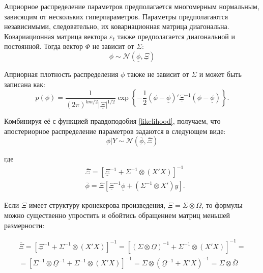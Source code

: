 \documentclass[11pt]{article} %
\newcommand{\cN}{\mathcal{N}}
\newcommand{\prior}{\underline}
\newcommand{\post}{\overline}
\begin{document}


Априорное распределение параметров предполагается многомерным нормальным, зависящим от нескольких гиперпараметров. Параметры предполагаются независимыми, следовательно, их ковариационная матрица диагональна. Ковариационная матрица вектора $\varepsilon_t$ также предполагается диагональной и постоянной.
Тогда вектор $\Phi$ не зависит от $\Sigma$:
\begin{equation}
\phi\sim \cN(\prior \phi, \prior \Xi)
\end{equation}

Априорная плотность распределения $\phi$ также не зависит от $\Sigma$ и может быть записана как:
\begin{equation}
p(\phi)=\frac{1}{(2\pi)^{km/2}|\prior\Xi|^{1/2}} \exp \left\lbrace-\frac{1}{2}(\phi-\prior \phi)'\prior\Xi^{-1}(\phi-\prior \phi ) \right\rbrace.
\end{equation}

Комбинируя её с функцией правдоподобия \eqref{likelihood}, получаем, что апостериорное распределение параметров задаются в следующем виде:
\begin{equation}
\phi|Y\sim \cN(\post{\phi},\post \Xi)
\end{equation}

где
\begin{align*}
&\post \Xi=[\prior \Xi^{-1}+\Sigma^{-1}\otimes(X'X)]^{-1}\\
& \post \phi=\post{\Xi}[\prior \Xi^{-1}\prior \phi+(\Sigma^{-1}\otimes X')y].
\end{align*}

Если $\prior\Xi$ имеет структуру кронекерова произведения, $\prior\Xi = \Sigma \otimes \prior{\Omega}$, то формулы можно существенно упростить и обойтись обращением матриц меньшей размерности:

\begin{multline}
\post \Xi=[\prior \Xi^{-1}+\Sigma^{-1}\otimes(X'X)]^{-1}=[(\Sigma \otimes \prior\Omega)^{-1}+\Sigma^{-1}\otimes(X'X)]^{-1}=\\
=[\Sigma^{-1}\otimes  \prior\Omega^{-1} +\Sigma^{-1}\otimes(X'X)]^{-1}=\Sigma \otimes (\prior\Omega^{-1}+ X'X)^{-1} = \Sigma \otimes \post \Omega
\end{multline}
\end{document}
